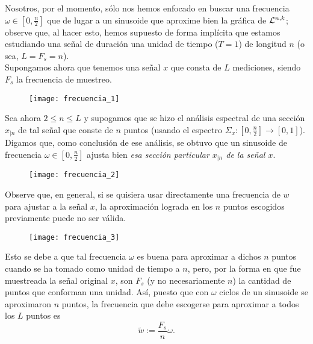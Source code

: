 Nosotros, por el momento, sólo nos
hemos enfocado en buscar
una frecuencia $\omega \in [0, \frac{n}{2}]$ que de lugar
a un sinusoide que aproxime bien la gráfica
de $\mathcal{L}^{n,k}$;
observe que, al hacer esto, hemos supuesto de forma
implícita que estamos estudiando una señal
de duración una unidad de tiempo
($T = 1$) de longitud $n$
(o sea, $L = F_{s} = n$). \\
Supongamos ahora que
tenemos una señal $x$ que consta de $L$ mediciones, siendo
$F_{s}$ la frecuencia de muestreo.
\begin{figure}[H]
	\centering
	\texttt{[image: frecuencia\_1]} 
\end{figure}	

Sea ahora $2 \leq n \leq L$ y
supogamos que
se hizo el análisis
espectral 
de una sección $x_{|n}$ de tal señal
que conste de $n$ puntos
(usando el espectro
$\Sigma_{x}: [0, \frac{n}{2}]
\longrightarrow [0,1]$).
Digamos que, como conclusión de ese análisis, se
obtuvo que un sinusoide de frecuencia $\omega \in [0, \frac{n}{2}]$
ajusta bien \textit{esa sección particular 
$x_{|n}$
de la señal $x$}.
\begin{figure}[H]
	\centering
	\texttt{[image: frecuencia\_2]} 
\end{figure}	

Observe que, en general, si se quisiera usar
directamente una frecuencia de $w$ para ajustar
a la señal $x$, la aproximación lograda en los
$n$ puntos escogidos previamente puede no ser válida.
\begin{figure}[H]
	\centering
	\texttt{[image: frecuencia\_3]} 
\end{figure}
Esto se debe a que	
tal frecuencia $\omega$ es buena para aproximar
a dichos $n$ puntos cuando se ha tomado como
unidad de tiempo a $n$, pero, 
por la forma en que fue muestreada la señal original $x$,
son $F_{s}$ (y no necesariamente $n$) la cantidad de puntos
que conforman una unidad. Así, puesto que con $\omega$
ciclos de un sinusoide se aproximaron $n$ puntos, 
la frecuencia que debe escogerse para aproximar a todos los $L$
puntos es
\begin{equation}
\label{eq: rel frecuencia real y ficticia}
\tilde{w} := \frac{F_{s}}{n} \omega.
\end{equation}

